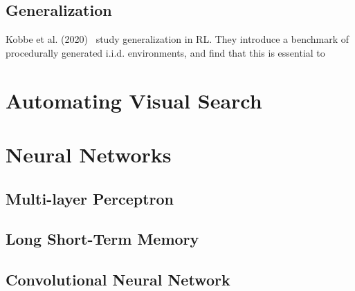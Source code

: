 
\subsection{Generalization}




Kobbe et al. (2020)~\cite{} study generalization in RL. They introduce a benchmark of procedurally generated i.i.d. environments, and find that this is essential to 


\section{Automating Visual Search}



\section{Neural Networks}

\subsection{Multi-layer Perceptron}

\subsection{Long Short-Term Memory}

\subsection{Convolutional Neural Network}